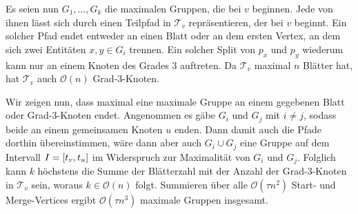\begin{beweis}
	Es seien nun $G_1, \ldots ,G_k$ die maximalen Gruppen, die bei $v$ beginnen.
	Jede von ihnen lässt sich durch einen Teilpfad in $\mathcal{T}_v$ repräsentieren, der bei $v$ beginnt.
	Ein solcher Pfad endet entweder an einen Blatt oder an dem ersten Vertex, an dem sich zwei Entitäten $x,y \in G_i$ trennen.
	Ein solcher Split von $p_x$ und $p_y$ wiederum kann nur an einem Knoten des Grades 3 auftreten.
	Da $\mathcal{T}_v$ maximal $n$ Blätter hat, hat $\mathcal{T}_v$ auch $\mathcal{O}(n)$ Grad-3-Knoten.
	
	Wir zeigen nun, dass maximal eine maximale Gruppe an einem gegebenen Blatt oder Grad-3-Knoten endet.
	Angenommen es gäbe $G_i$ und $G_j$ mit $i \neq j$, sodass beide an einem gemeinsamen Knoten $u$ enden.
	Dann damit auch die Pfade dorthin übereinstimmen, wäre dann aber auch $G_i \cup G_j$ eine Gruppe auf dem Intervall $I=\benbrace*{t_v,t_u}$ im Widerspruch zur Maximalität von $G_i$ und $G_j$.
	Folglich kann $k$ höchstens die Summe der Blätterzahl mit der Anzahl der Grad-3-Knoten in $\mathcal{T}_v$ sein, woraus $k \in \mathcal{O}(n)$ folgt.
	Summieren über alle $\mathcal{O}(\tau n^2)$ Start- und Merge-Vertices ergibt $\mathcal{O}(\tau n^3)$ maximale Gruppen insgesamt.
\end{beweis}
